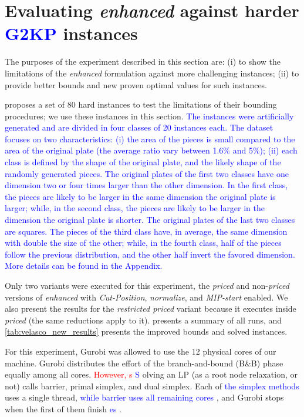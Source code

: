 \documentclass[ppgc,tese,english,formais,babel]{iiufrgs}
\newif\iffinalversion
\newcommand{\newtext}[1]{\iffinalversion%
#1%
\else%
\textcolor{blue}{#1}%
\fi%
}
\newcommand{\oldtext}[1]{\iffinalversion%
\else%
\textcolor{red}{#1}%
\fi%
}
\begin{document}
\section{Evaluating \emph{enhanced} against harder \newtext{G2KP} instances}
\label{sec:new_results}

The purposes of the experiment described in this section are:
(i) to show the limitations of the \emph{enhanced} formulation against more challenging instances;
(ii) to provide better bounds and new proven optimal values for such instances.

\citet{velasco:2019} proposes a set of 80 hard instances to test the limitations of their bounding procedures; we use these instances in this section.
\newtext{The instances were artificially generated and are divided in four classes of 20 instances each. The dataset focuses on two characteristics: (i) the area of the pieces is small compared to the area of the original plate (the average ratio vary between 1.6\% and 5\%); (ii) each class is defined by the shape of the original plate, and the likely shape of the randomly generated pieces. The original plates of the first two classes have one dimension two or four times larger than the other dimension. In the first class, the pieces are likely to be larger in the same dimension the original plate is larger; while, in the second class, the pieces are likely to be larger in the dimension the original plate is shorter. The original plates of the last two classes are squares. The pieces of the third class have, in average, the same dimension with double the size of the other; while, in the fourth class, half of the pieces follow the previous distribution, and the other half invert the favored dimension. More details can be found in the Appendix.}

Only two variants were executed for this experiment, the \emph{priced} and non-\emph{priced} versions of \emph{enhanced} with \emph{Cut-Position}, \emph{normalize}, and \emph{MIP-start} enabled.
We also present the results for the \emph{restricted priced} variant because it executes inside \emph{priced} (the same reductions apply to it).
 presents a summary of all runs, and \cref{tab:velasco_new_results} presents the improved bounds and solved instances.

For this experiment, Gurobi was allowed to use the 12 physical cores of our machine.
Gurobi distributes the effort of the branch-and-bound (B\&B) phase equally among all cores.
\oldtext{However, s}\newtext{S}olving an LP (as a root node relaxation, or not) calls barrier, primal simplex, and dual simplex.
Each of \newtext{the simplex methods} uses a single thread, \newtext{while barrier uses all remaining cores}, and Gurobi stops when the first of them finish\newtext{es}.
\end{document}
